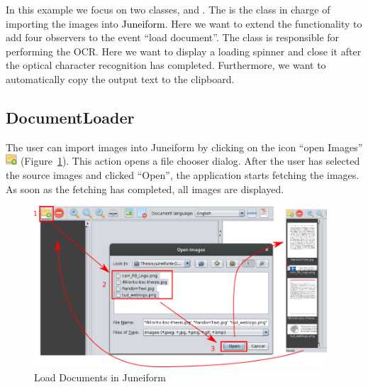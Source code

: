 \documentclass[type=bsc,accentcolor=tud9c]{tudthesis}
\newcommand{\framework}[1]{\textcolor{black}{#1}}
\begin{document}
In this example we focus on two classes,  and . The  is the class in charge of importing the images into \framework{Juneiform}. Here we want to extend the functionality to add four observers to the event ``load document''. The  class is responsible for performing the OCR. Here we want to display a loading spinner and close it after the optical character recognition has completed. Furthermore, we want to automatically copy the output text to the clipboard.

\subsection{DocumentLoader}

The user can import images into Juneiform by clicking on the icon ``open Images'' \includegraphics[height=0.4cm]{juneiform/open-icon.png} (Figure~\ref{fig:loadDocs}). This action opens a file chooser dialog. After the user has selected the source images and clicked ``Open'', the application starts fetching the images. As soon as the fetching has completed, all images are displayed.

\begin{figure}[H]
\begin{center}
\includegraphics[height=6cm]{juneiform/DocumentLoader.png}
\caption{Load Documents in Juneiform}
\label{fig:loadDocs}
\end{center}
\end{figure}
\end{document}
